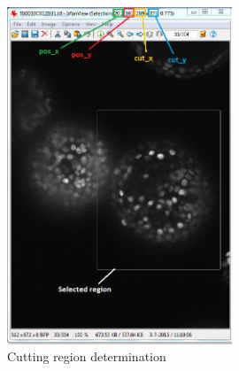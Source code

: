 \documentclass[12pt]{article}
\begin{document}
\begin{figure}[h]
\centering
\includegraphics[width=0.6\textwidth]{cutting_region.png}
\caption{Cutting region determination \label{fig_cutting}}
\end{figure}


\end{document}
